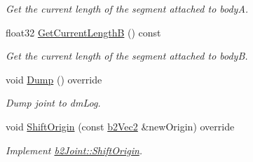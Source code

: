 \begin{DoxyCompactItemize}
\begin{DoxyCompactList}\small\item\em Get the current length of the segment attached to bodyA. \end{DoxyCompactList}\item 
\mbox{\label{classb2_pulley_joint_aa2d15dc26b2df0a446ccda652058085d}} 
float32 \hyperlink{classb2_pulley_joint_aa2d15dc26b2df0a446ccda652058085d}{Get\+Current\+LengthB} () const
\begin{DoxyCompactList}\small\item\em Get the current length of the segment attached to bodyB. \end{DoxyCompactList}\item 
\mbox{\label{classb2_pulley_joint_a51b3fa745fc43f806cee1328099b4623}} 
void \hyperlink{classb2_pulley_joint_a51b3fa745fc43f806cee1328099b4623}{Dump} () override
\begin{DoxyCompactList}\small\item\em Dump joint to dm\+Log. \end{DoxyCompactList}\item 
\mbox{\label{classb2_pulley_joint_a5a9e626c758380fe565837bedb3dc018}} 
void \hyperlink{classb2_pulley_joint_a5a9e626c758380fe565837bedb3dc018}{Shift\+Origin} (const \hyperlink{structb2_vec2}{b2\+Vec2} \&new\+Origin) override
\begin{DoxyCompactList}\small\item\em Implement \hyperlink{classb2_joint_a7804f649e993dc0fd9ae47fde5601f90}{b2\+Joint\+::\+Shift\+Origin}. \end{DoxyCompactList}\end{DoxyCompactItemize}

